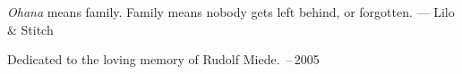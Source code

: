 
\thispagestyle{empty}


\vspace*{3cm}

\begin{center}
\emph{Ohana} means family. 
Family means nobody gets left behind, or forgotten.  \medskip
--- Lilo \& Stitch    
\end{center}

\medskip

\begin{center}
Dedicated to the loving memory of Rudolf Miede.  \,--\,2005
\end{center}
